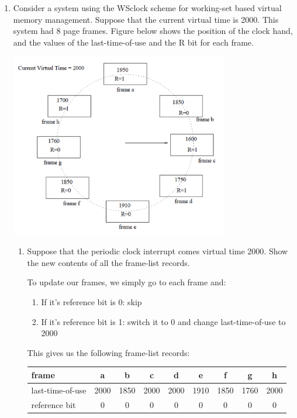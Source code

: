 \documentclass[11pt]{article}
\newcommand{\n}{\vspace{0.3cm}}
\begin{document}
\begin{enumerate}
  \item Consider a system using the WSclock scheme for working-set based virtual memory management.  Suppose that the current virtual time is 2000.  This system had 8 page frames.  Figure below shows the position of the clock hand, and the values of the last-time-of-use and the R bit for each frame.
    \begin{center}
      \includegraphics[width=0.75\textwidth]{5.png}
    \end{center}
    \begin{enumerate}
      \item Suppose that the periodic clock interrupt comes virtual time 2000.  Show the new contents of all the frame-list records. \n

        To update our frames, we simply go to each frame and:
        \begin{enumerate}
          \item If it's reference bit is 0: skip
          \item If it's reference bit is 1: switch it to 0 and change last-time-of-use to 2000
        \end{enumerate}
        This gives us the following frame-list records:
        \begin{center}
          \begin{tabular}[c]{|l|c|c|c|c|c|c|c|c|}
            \hline
            frame & a & b & c & d & e & f & g & h \\
            \hline
            last-time-of-use & 2000 & 1850 & 2000 & 2000 & 1910 & 1850 & 1760 & 2000 \\
            \hline
            reference bit & 0 & 0 & 0 & 0 & 0 & 0 & 0 & 0 \\
            \hline
          \end{tabular} \n
        \end{center}
        

\end{enumerate}
\end{enumerate}
\end{document}
